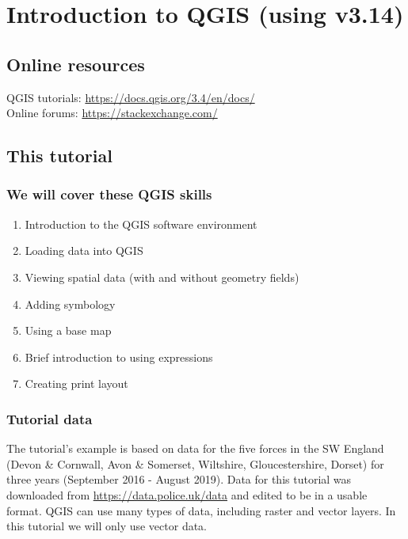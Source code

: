 \chapter{Introduction to QGIS (using v3.14)}

\pagestyle{fancy}
\fancyhf{}
\fancyhead[OC]{\leftmark}
\fancyhead[EC]{\rightmark}
\cfoot{\thepage}


\section{Online resources}

QGIS tutorials: \url{https://docs.qgis.org/3.4/en/docs/} \\
Online forums:  \url{https://stackexchange.com/} \\

\section{This tutorial}

\subsection{We will cover these QGIS skills}
\begin{enumerate}[~~~1)]
	\item
	Introduction to the QGIS software environment
	\item
	Loading data into QGIS
	\item
	Viewing spatial data (with and without geometry fields)
	\item
	Adding symbology
	\item
	Using a base map
	\item
	Brief introduction to using expressions
	\item
	Creating print layout
\end{enumerate}


\subsection{Tutorial data}
The tutorial's example is based on data for the five forces in the SW England (Devon \& Cornwall, Avon \& Somerset, Wiltshire, Gloucestershire, Dorset) for three years (September 2016 - August 2019). Data for this tutorial was downloaded from \url{ https://data.police.uk/data}
and edited to be in a usable format. QGIS can use many types of data, including raster and vector layers. In this tutorial we will only use vector data.\\

